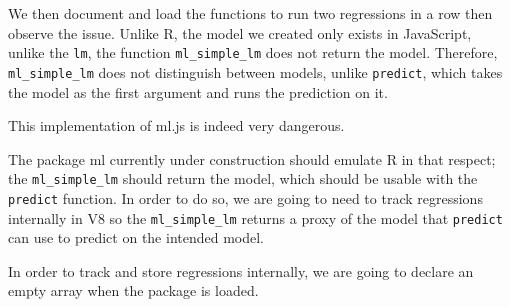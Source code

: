 \documentclass[10pt,]{krantz}
\makeatletter
\newenvironment{Shaded}{\begin{snugshade}}{\end{snugshade}}
\newcommand{\CommentTok}[1]{\textcolor[rgb]{0.37,0.37,0.37}{\textit{#1}}}
\newcommand{\ControlFlowTok}[1]{\textcolor[rgb]{0.27,0.27,0.27}{\textbf{#1}}}
\newcommand{\DataTypeTok}[1]{\textcolor[rgb]{0.27,0.27,0.27}{#1}}
\newcommand{\DecValTok}[1]{\textcolor[rgb]{0.06,0.06,0.06}{#1}}
\newcommand{\KeywordTok}[1]{\textcolor[rgb]{0.27,0.27,0.27}{\textbf{#1}}}
\newcommand{\NormalTok}[1]{#1}
\newcommand{\OperatorTok}[1]{\textcolor[rgb]{0.43,0.43,0.43}{\textbf{#1}}}
\newcommand{\OtherTok}[1]{\textcolor[rgb]{0.37,0.37,0.37}{#1}}
\newcommand{\StringTok}[1]{\textcolor[rgb]{0.5,0.5,0.5}{#1}}
\newenvironment{kframe}{%
\medskip{}
\setlength{\fboxsep}{.8em}
 \def\at@end@of@kframe{}%
 \ifinner\ifhmode%
  \def\at@end@of@kframe{\end{minipage}}%
  \begin{minipage}{\columnwidth}%
 \fi\fi%
 \def\FrameCommand##1{\hskip\@totalleftmargin \hskip-\fboxsep
 \colorbox{shadecolor}{##1}\hskip-\fboxsep
     \hskip-\linewidth \hskip-\@totalleftmargin \hskip\columnwidth}%
 \MakeFramed {\advance\hsize-\width
   \@totalleftmargin\z@ \linewidth\hsize
   \@setminipage}}%
 {\par\unskip\endMakeFramed%
 \at@end@of@kframe}
\renewenvironment{Shaded}{\begin{kframe}}{\end{kframe}}
\makeatother
\begin{document}
We then document and load the functions to run two regressions in a row then observe the issue. Unlike R, the model we created only exists in JavaScript, unlike the \texttt{lm}, the function \texttt{ml\_simple\_lm} does not return the model. Therefore, \texttt{ml\_simple\_lm} does not distinguish between models, unlike \texttt{predict}, which takes the model as the first argument and runs the prediction on it.

This implementation of ml.js is indeed very dangerous.

\begin{Shaded}
\end{Shaded}

The package ml currently under construction should emulate R in that respect; the \texttt{ml\_simple\_lm} should return the model, which should be usable with the \texttt{predict} function. In order to do so, we are going to need to track regressions internally in V8 so the \texttt{ml\_simple\_lm} returns a proxy of the model that \texttt{predict} can use to predict on the intended model.

In order to track and store regressions internally, we are going to declare an empty array when the package is loaded.

\begin{Shaded}
\end{Shaded}
\end{document}
